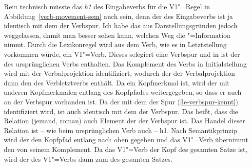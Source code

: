 Rein technisch müsste das \textit{h1} des Eingabeverbs für die V1"=Regel in Abbildung~\ref{verb-movement-sem} auch  sein, denn
der \contw des Eingabeverbs ist ja identisch mit dem der Verbspur. Ich habe das aus
Darstellungsgründen jedoch weggelassen, damit man besser sehen kann, welchen Weg die
\ltop"=Information nimmt. Durch die Lexikonregel wird aus dem Verb, wie es in Letztstellung
vorkommen würde, ein V1"=Verb. Dieses selegiert eine Verbspur und in \dsl ist der \contw des
ursprünglichen Verbs  enthalten. Das Komplement des Verbs in Initialstellung  wird
mit der Verbalprojektion identifiziert, wodurch der \dslw der Verbalprojektion dann den \contw des
Verbletztverbs  enthält. Da \dsl ein Kopfmerkmal ist, wird der \dslw mit anderen
Kopfmerkmalen entlang des Kopfpfades weitergegeben, so dass er auch an der Verbspur vorhanden
ist. Da der \dslw mit dem \localw der Spur (\ref{le-verbspur-kennt}) identifiziert wird, ist  auch identisch mit dem
\contw der Verbspur. Das heißt, dass die Relation (jemand, roman) auch Element der
\relsl der Verbspur ist. Das Handel dieser Relation ist -- wie beim ursprünglichen Verb auch --
h1. Nach Semantikprinzip wird der \ltopw den Kopfpfad entlang nach oben gegeben und das V1"=Verb
übernimmt den \ltopw von seinem Komplement. Da das V1"=Verb der Kopf des gesamten Satze ist, wird
der \ltopw des V1"=Verbs dann zum \ltopw des gesamten Satzes.

